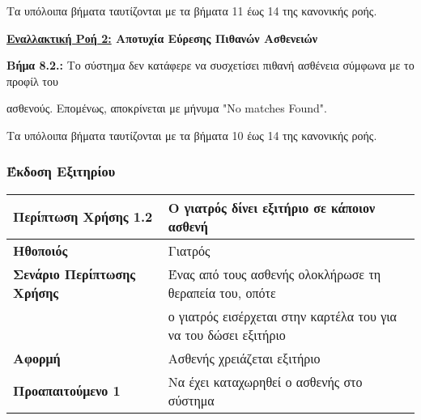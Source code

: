 \documentclass{article}
\newcommand\T{\rule{0pt}{2.6ex}}       %
\newcommand\B{\rule[-1.2ex]{0pt}{0pt}}
\begin{document}
\par Τα υπόλοιπα βήματα ταυτίζονται με τα βήματα 11 έως 14 της κανονικής ροής. \vspace{0.2cm}

\textbf{\underline{Εναλλακτική Ροή 2:} Αποτυχία Εύρεσης Πιθανών Ασθενειών}  \vspace{0.2cm}
\par \textbf{Βήμα 8.2.:} Το σύστημα δεν κατάφερε να συσχετίσει πιθανή ασθένεια σύμφωνα με το προφίλ του \par ασθενούς. Επομένως, αποκρίνεται με μήνυμα "No matches Found". \vspace{0.1cm}

\par Τα υπόλοιπα βήματα ταυτίζονται με τα βήματα 10 έως 14 της κανονικής ροής.

\subsubsection{Έκδοση Εξιτηρίου}
 
 \begin{center}
     \begin{tabular}{|l|l|}
     \hline
      \textbf{Περίπτωση Χρήσης 1.2} & Ο γιατρός δίνει εξιτήριο σε κάποιον ασθενή \T\B \\ 
      \hline
      \textbf{Ηθοποιός} & Γιατρός \T\B \\
      \hline
      \textbf{Σενάριο Περίπτωσης Χρήσης} & Ένας από τους ασθενής ολοκλήρωσε τη θεραπεία του, οπότε \T\\& ο γιατρός εισέρχεται στην καρτέλα του για να του δώσει εξιτήριο \B \\
      \hline
      \textbf{Αφορμή} & Ασθενής χρειάζεται εξιτήριο \T\B \\
      \hline
      \textbf{Προαπαιτούμενο 1} & Να έχει καταχωρηθεί ο ασθενής στο σύστημα \T\B \\
      \hline
     \end{tabular}
 \end{center}
 
\newpage
\end{document}
